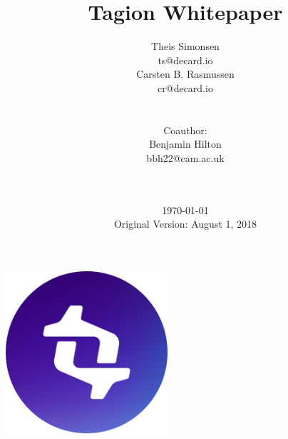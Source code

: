 
\title{Tagion Whitepaper}
\date{\today \\[4mm] Original Version: August 1, 2018}
\author{
  \begin{minipage}{0.3\textwidth}
    \centering
    Theis Simonsen \\
    ts@decard.io
  \end{minipage}
  \hspace{0\textwidth}
  \begin{minipage}{0.3\textwidth}
    \centering
    Carsten B. Rasmussen \\
    cr@decard.io
  \end{minipage}\\[5mm]
  \begin{minipage}{\textwidth}
    \centering
    \small Coauthor: \\
    \small Benjamin Hilton \\
    \small bbh22@cam.ac.uk \\[3ex]
  \end{minipage}\\[5mm]
}
\maketitle
\begin{center}
\includegraphics[width = 60mm]{figures/logo.png} \\[3mm]
\end{center}